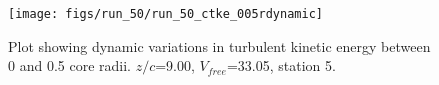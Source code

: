 \begin{figure}[H]
\centering
\texttt{[image: figs/run\_50/run\_50\_ctke\_005rdynamic]}
\caption{Plot showing dynamic variations in turbulent kinetic energy between 0 and 0.5 core radii. $z/c$=9.00, $V_{free}$=33.05, station 5.}
\label{fig:run_50_ctke_005rdynamic}
\end{figure}


